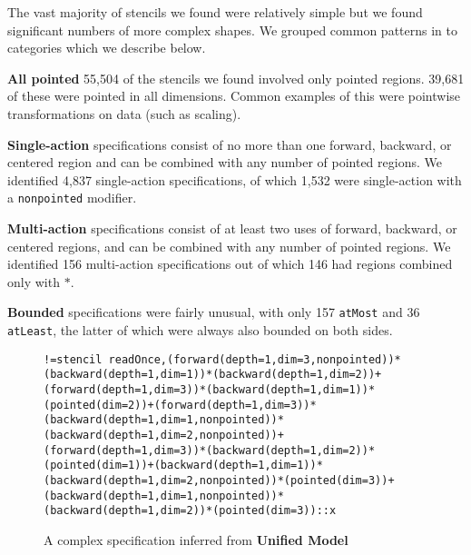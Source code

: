 \documentclass[10pt,preprint,numbers]{sigplanconf}
\theoremstyle{definition}
\newcommand{\term}[1]{\texttt{#1}}
\begin{document}
%


The vast majority of stencils we found were relatively simple but we
found significant numbers of more complex shapes. We grouped common
patterns in to categories which we describe below.

\textbf{All pointed} 55,504 of the stencils we found involved 
only pointed regions. 39,681 of these were pointed in all
dimensions. Common examples of this were pointwise transformations on
data (such as scaling).

\textbf{Single-action} specifications consist of no more than one 
forward, backward, or centered region and can be combined with any
number of pointed regions. We identified 4,837 single-action
specifications, of which 1,532 were single-action with a
\texttt{nonpointed} modifier.

\textbf{Multi-action} specifications consist of at least two uses 
of forward, backward, or centered regions, and can be combined with
any number of pointed regions. We identified 156 multi-action
specifications out of which 146 had regions combined only with
$\term{*}$.

\textbf{Bounded} specifications were fairly unusual, with only 157
\texttt{atMost} and 36 \texttt{atLeast}, the latter of which were
always also bounded on both sides.

\begin{figure}[t]\begin{verbatim}
!=stencil readOnce,(forward(depth=1,dim=3,nonpointed))*(backward(depth=1,dim=1))*(backward(depth=1,dim=2))+(forward(depth=1,dim=3))*(backward(depth=1,dim=1))*(pointed(dim=2))+(forward(depth=1,dim=3))*(backward(depth=1,dim=1,nonpointed))*(backward(depth=1,dim=2,nonpointed))+(forward(depth=1,dim=3))*(backward(depth=1,dim=2))*(pointed(dim=1))+(backward(depth=1,dim=1))*(backward(depth=1,dim=2,nonpointed))*(pointed(dim=3))+(backward(depth=1,dim=1,nonpointed))*(backward(depth=1,dim=2))*(pointed(dim=3))::x
\end{verbatim}
\caption{A complex specification inferred from
  \textbf{Unified Model}\label{fig:smagorinsky}}
\vspace{-1em}
\end{figure}
\end{document}
